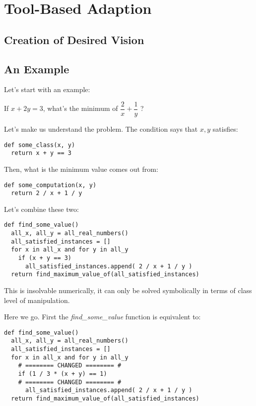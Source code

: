 \section{Tool-Based Adaption}
\subsection{Creation of Desired Vision}
\subsection*{An Example}
Let's start with an example:
\begin{example}
  If $x + 2y =3$, what's the minimum of $\dfrac{2}{x} + \dfrac{1}{y}$ ?
\end{example}

Let's make us understand the problem. The condition says that $x, y$ satisfies:

\begin{verbatim}
def some_class(x, y)
  return x + y == 3
\end{verbatim}

Then, what is the minimum value comes out from:

\begin{verbatim}
def some_computation(x, y)
  return 2 / x + 1 / y
\end{verbatim}

Let's combine these two:

\begin{verbatim}
def find_some_value()
  all_x, all_y = all_real_numbers()
  all_satisfied_instances = []
  for x in all_x and for y in all_y
    if (x + y == 3)
      all_satisfied_instances.append( 2 / x + 1 / y )
  return find_maximum_value_of(all_satisfied_instances)
\end{verbatim}

This is insolvable numerically, it can only be solved symbolically in terms of class level of manipulation.

Here we go. First the \textit{find\_some\_value} function is equivalent to:
\begin{verbatim}
def find_some_value()
  all_x, all_y = all_real_numbers()
  all_satisfied_instances = []
  for x in all_x and for y in all_y
    # ======== CHANGED ======== #
    if (1 / 3 * (x + y) == 1)
    # ======== CHANGED ======== #
      all_satisfied_instances.append( 2 / x + 1 / y )
  return find_maximum_value_of(all_satisfied_instances)
\end{verbatim}

